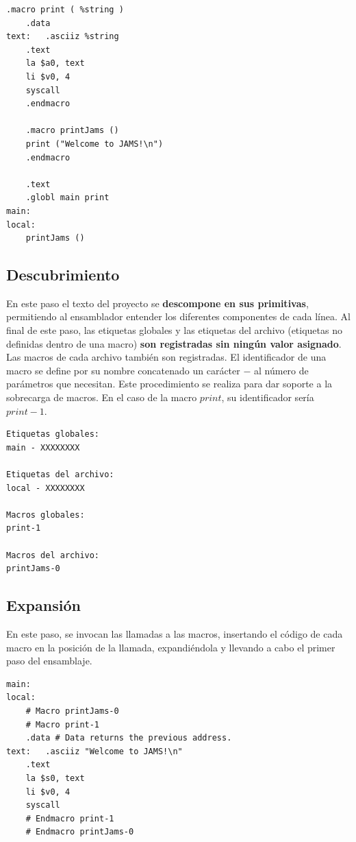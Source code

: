 \begin{lstlisting}[frame=single,label={lst:example.asm}]
    .macro print ( %string )
    .data
text:   .asciiz %string
    .text
    la $a0, text
    li $v0, 4
    syscall
    .endmacro

    .macro printJams ()
    print ("Welcome to JAMS!\n")
    .endmacro

    .text
    .globl main print
main:
local:
    printJams ()
\end{lstlisting}

\subsection{Descubrimiento}\label{subsec:descubrimiento}

En este paso el texto del proyecto se \textbf{descompone en sus primitivas},
permitiendo al ensamblador entender los diferentes componentes de cada línea.
Al final de este paso, las etiquetas globales y las etiquetas del archivo
(etiquetas no definidas dentro de una macro) \textbf{son registradas sin
ningún valor asignado}.
Las macros de cada archivo también son registradas.
El identificador de una macro se define por su nombre concatenado
un carácter $-$ al número de parámetros que necesitan.
Este procedimiento se realiza para dar soporte a la sobrecarga de macros.
En el caso de la macro $print$, su identificador sería $print-1$.

\begin{lstlisting}[frame=single,label={lst:descubrimiento}]
Etiquetas globales:
main - XXXXXXXX

Etiquetas del archivo:
local - XXXXXXXX

Macros globales:
print-1

Macros del archivo:
printJams-0
\end{lstlisting}

\subsection{Expansión}\label{subsec:expansion}

En este paso, se invocan las llamadas a las macros,
insertando el código de cada macro en la posición de la llamada,
expandiéndola y llevando a cabo el primer paso del ensamblaje.

\begin{lstlisting}[frame=single,label={lst:expansion}]
main:
local:
    # Macro printJams-0
    # Macro print-1
    .data # Data returns the previous address.
text:   .asciiz "Welcome to JAMS!\n"
    .text
    la $s0, text
    li $v0, 4
    syscall
    # Endmacro print-1
    # Endmacro printJams-0
\end{lstlisting}

